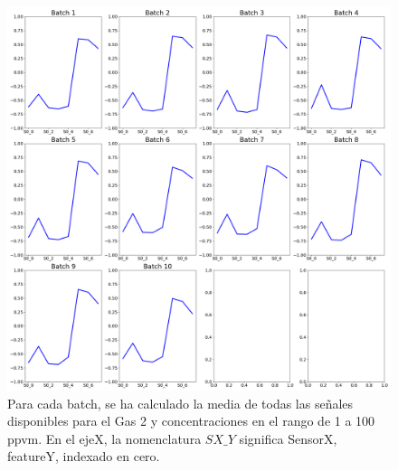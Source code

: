 \begin{figure}[h!]
	\centering
	\includegraphics[width=1\linewidth]{../py_imgs/Step0_Evolution_of_signal_sensor1_mean}
	\caption[Media de las señales disponibles para Gas 2, concentraciones 1-100, evolucion para cada batch]{Para cada batch, se ha calculado la media de todas las señales disponibles para el Gas 2 y concentraciones en el rango de 1 a 100 ppvm. En el ejeX, la nomenclatura $SX\_Y$ significa SensorX, featureY, indexado en cero.}
	\label{fig:step0evolutionofsignalsensor1_mean}
\end{figure}




